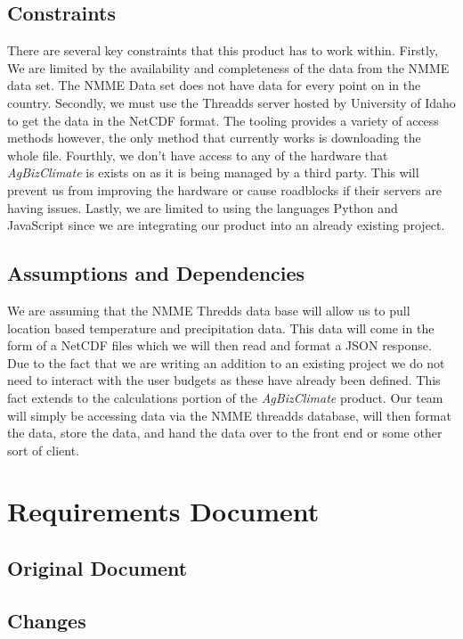 \documentclass[onecolumn, draftclsnofoot,10pt, compsoc]{article}
\begin{document}
	\subsection{Constraints}
		There are several key constraints that this product has to work within. Firstly, We are limited by the availability and completeness of the data from the NMME data set. The NMME Data set does not have data for every point on in the country. Secondly, we must use the Threadds server hosted by University of Idaho to get the data in the NetCDF format. The tooling provides a variety of access methods however, the only method that currently works is downloading the whole file. Fourthly, we don’t have access to any of the hardware that \textit{AgBizClimate} is exists on as it is being managed by a third party. This will prevent us from improving the hardware or cause roadblocks if their servers are having issues. Lastly, we are limited to using the languages Python and JavaScript since we are integrating our product into an already existing project.\\

	\subsection {Assumptions and Dependencies}
		We are assuming that the NMME Thredds data base will allow us to pull location based temperature and precipitation data. This data will come in the form of a NetCDF files which we will then read and format a JSON response. Due to the fact that we are writing an addition to an existing project we do not need to interact with the user budgets as these have already been defined. This fact extends to the calculations portion of the \textit{AgBizClimate} product. Our team will simply be accessing data via the NMME threadds database, will then format the data, store the data, and hand the data over to the front end or some other sort of client.\\


\section{Requirements Document}
    \subsection{Original Document}
        

    \subsection{Changes}
\end{document}
